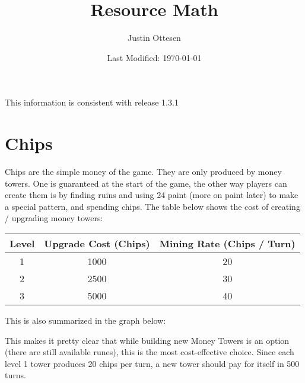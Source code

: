 \documentclass{article}
\title{Resource Math}
\author{Justin Ottesen}
\date{Last Modified: \today}
\begin{document}
  \maketitle

  This information is consistent with release 1.3.1

  \section*{Chips}

  Chips are the simple money of the game. They are only produced by money towers. One is guaranteed at the start of the game, the other way players can create them is by finding ruins and using 24 paint (more on paint later) to make a special pattern, and spending chips. The table below shows the cost of creating / upgrading money towers:
  \begin{center}
    \begin{tabular}{c | c | c}
      Level & Upgrade Cost (Chips) & Mining Rate (Chips / Turn) \\
      \hline 
      1 & 1000 & 20   \\
      2 & 2500 & 30   \\
      3 & 5000 & 40   \\
    \end{tabular}
  \end{center}
  This is also summarized in the graph below:
  \begin{center}
  \end{center}
  This makes it pretty clear that while building new Money Towers is an option (there are still available runes), this is the most cost-effective choice. Since each level 1 tower produces 20 chips per turn, a new tower should pay for itself in 500 turns.
\end{document}
